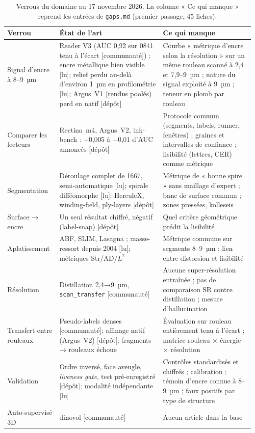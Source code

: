 \documentclass[11pt,a4paper]{article}
\newcommand{\lu}{\textsf{\small[lu]}}
\newcommand{\commu}{\textsf{\small[communauté]}}
\newcommand{\depot}{\textsf{\small[dépôt]}}
\begin{document}
\begin{table}[h]
\centering\small
\begin{tabularx}{\linewidth}{@{}p{2.9cm}LL@{}}
\toprule
Verrou & État de l'art & Ce qui manque \\
\midrule
Signal d'encre à 8–9~µm & Reader V3 (AUC 0,92 sur 0841 tenu à l'écart \commu) ; encre métallique bien visible \lu ; relief perdu au-delà d'environ 1~µm en profilométrie \lu ; Argus~V1 (rendus poolés) perd en natif \depot & Courbe « métrique d'encre selon la résolution » sur un même rouleau scanné à 2,4 et 7,9–9~µm ; nature du signal exploité à 9~µm ; teneur en plomb par rouleau \\
Comparer les lecteurs & Rectina~m4, Argus~V2, ink-bench : +0,005 à +0,01 d'AUC annoncés \depot & Protocole commun (segments, labels, runner, fenêtres) ; graines et intervalles de confiance ; lisibilité (lettres, CER) comme métrique \\
Segmentation & Déroulage complet de 1667, semi-automatique \lu ; spirale difféomorphe \lu ; HerculeX, winding-field, ply-layers \depot & Métrique de « bonne spire » sans maillage d'expert ; banc de surface commun ; zones pressées, kolleseis \\
Surface → encre & Un seul résultat chiffré, négatif (label-snap) \depot & Quel critère géométrique prédit la lisibilité \\
Aplatissement & ABF, SLIM, Lasagna ; masse-ressort depuis 2004 \lu ; métriques Str/AD/$L^2$ & Métrique commune sur segments 8–9~µm ; lien entre distorsion et lisibilité \\
Résolution & Distillation 2,4→9~µm, \texttt{scan\_transfer} \commu & Aucune super-résolution entraînée ; pas de comparaison SR contre distillation ; mesure d'hallucination \\
Transfert entre rouleaux & Pseudo-labels denses \commu ; affinage natif (Argus~V2) \depot ; fragments → rouleaux échoue & Évaluation sur rouleau entièrement tenu à l'écart ; matrice rouleau × énergie × résolution \\
Validation & Ordre inversé, face aveugle, \emph{liveness gate}, test pré-enregistré \depot ; modalité indépendante \lu & Contrôles standardisés et chiffrés ; calibration ; témoin d'encre connue à 8–9~µm ; faux positifs par type de structure \\
Auto-supervisé 3D & dinovol \commu & Aucun article dans la base \\
\bottomrule
\end{tabularx}
\caption{Verrous du domaine au 17 novembre 2026. La colonne « Ce qui manque » reprend
les entrées de \nolinkurl{gaps.md} (premier passage, 45 fiches).}
\end{table}
\end{document}
